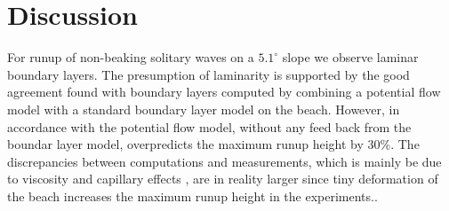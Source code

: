 \documentclass[a4paper, 11pt, english, twoside, openright]{article}
\begin{document}
 
 
 
\section{Discussion}
\label{con_rem}

For runup of non-beaking solitary waves on a $5.1^\circ$ slope we 
observe laminar boundary layers. The presumption of laminarity is
 supported by the good agreement found with boundary layers computed 
by combining a potential flow model with a standard boundary layer model on the beach. However, in accordance with \cite{pedersen2013runp} the
potential flow model, without any feed back from the boundar layer model, overpredicts the
maximum runup height by  30\%.  
The discrepancies between computations and measurements, which is mainly be due to viscosity and capillary effects , are in  reality larger since tiny deformation of the beach increases the maximum runup height in the experiments.. 
\end{document}
